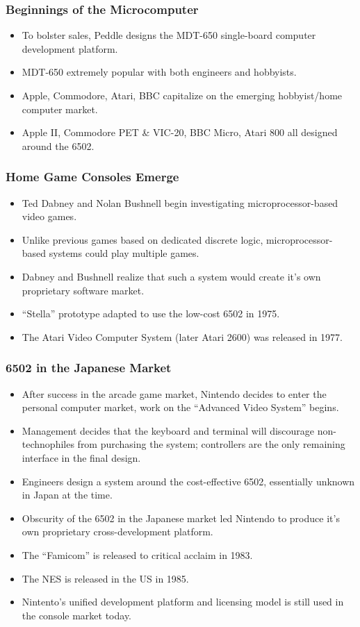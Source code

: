 \documentclass{beamer}
\begin{document}
\begin{frame}
\frametitle{Beginnings of the Microcomputer}
\begin{itemize}
\item To bolster sales, Peddle designs the MDT-650 single-board computer development platform.
\item MDT-650 extremely popular with both engineers and hobbyists.
\item Apple, Commodore, Atari, BBC capitalize on the emerging hobbyist/home computer market.
\item Apple II, Commodore PET \& VIC-20, BBC Micro, Atari 800 all designed around the 6502.
\end{itemize}
\end{frame}

\begin{frame}
\frametitle{Home Game Consoles Emerge}
\begin{itemize}
\item Ted Dabney and Nolan Bushnell begin investigating microprocessor-based video games.
\item Unlike previous games based on dedicated discrete logic, microprocessor-based systems could play multiple games.
\item Dabney and Bushnell realize that such a system would create it's own proprietary software market.
\item ``Stella'' prototype adapted to use the low-cost 6502 in 1975.
\item The Atari Video Computer System (later Atari 2600) was released in 1977.
\end{itemize}
\end{frame}

\begin{frame}
\frametitle{6502 in the Japanese Market}
\begin{itemize}
\item After success in the arcade game market, Nintendo decides to enter the personal computer market, work on the ``Advanced Video System'' begins.
\item Management decides that the keyboard and terminal will discourage non-technophiles from purchasing the system; controllers are the only remaining interface in the final design.
\item Engineers design a system around the cost-effective 6502, essentially unknown in Japan at the time.
\item Obscurity of the 6502 in the Japanese market led Nintendo to produce it's own proprietary cross-development platform.
\item The ``Famicom'' is released to critical acclaim in 1983.
\item The NES is released in the US in 1985.
\item Nintento's unified development platform and licensing model is still used in the console market today.
\end{itemize}
\end{frame}
\end{document}
